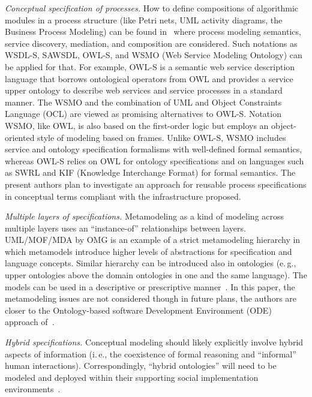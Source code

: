 \begin{multicols}{2}
{}

  \textit{Conceptual specification of processes.} How to define compositions of
algorithmic modules in a process structure (like Petri nets, UML activity diagrams,
the Business Process Modeling) can be found in~\cite{49-kal} where process
modeling semantics, service discovery, mediation, and composition are considered.
Such notations as WSDL-S, SAWSDL, OWL-S, and WSMO
(Web Service Modeling
Ontology) can be applied for that.
For example, OWL-S is a semantic web service description language that borrows
ontological operators from OWL and provides a service upper ontology to describe
web services and service processes in a standard manner.
The WSMO and the combination of UML and
Object Constraints Language (OCL) are viewed as promising alternatives to OWL-S.
Notation WSMO, like OWL, is also based on the first-order logic but employs an object-oriented
style of modeling based on frames. Unlike OWL-S, WSMO includes service
and ontology specification formalisms with well-defined formal semantics, whereas
OWL-S relies on OWL for ontology specifications and on languages such as SWRL
and KIF (Knowledge Interchange Format) for formal semantics. The
present authors plan to investigate an approach for reusable
process specifications in conceptual terms compliant with the infrastructure proposed.
{ %

}

  \textit{Multiple layers of specifications.} Metamodeling as a kind of modeling
across multiple layers uses an ``instance-of'' relationships between layers.
UML/MOF/MDA by OMG is an example of a strict metamodeling hierarchy in
which metamodels introduce higher levels of abstractions for specification and
language concepts. Similar hierarchy can be introduced also in ontologies (e.\,g.,
upper ontologies above the domain ontologies in one and the same language). The
models can be used in a descriptive or prescriptive manner~\cite{50-kal}.
In this paper, the metamodeling issues are not considered
though in future plans, the authors are closer to the
Ontology-based software Development Environment (ODE) approach
  of~\cite{51-kal}.

  \textit{Hybrid specifications.} Conceptual modeling should likely explicitly
involve hybrid aspects of information (i.\,e., the coexistence of formal reasoning and
``informal'' human interactions). Correspondingly, ``hybrid ontologies'' will need to
be modeled and deployed within their supporting social implementation
environments~\cite{52-kal}.


\end{multicols}
